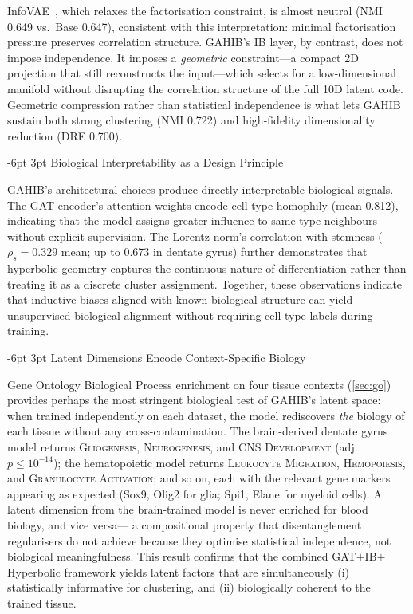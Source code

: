 \documentclass[preprint,12pt]{elsarticle}
\makeatletter
\renewcommand\subsection{\@startsection{subsection}{2}{\z@}%
  {-6pt \@plus -2pt \@minus -2pt}%
  {3pt \@plus 1pt \@minus 1pt}%
  {\normalfont\large\bfseries}}
\makeatother
\begin{document}
InfoVAE~\cite{zhao2019infovae}, which relaxes the factorisation
constraint, is almost neutral (NMI 0.649 vs.\ Base 0.647), consistent
with this interpretation: minimal factorisation pressure preserves
correlation structure.
GAHIB's IB layer, by contrast, does not impose independence. It imposes
a \emph{geometric} constraint---a compact 2D projection that still
reconstructs the input---which selects for a low-dimensional manifold
without disrupting the correlation structure of the full 10D latent
code. Geometric compression rather than statistical independence is
what lets GAHIB sustain both strong clustering (NMI 0.722) and
high-fidelity dimensionality reduction (DRE 0.700).

\subsection{Biological Interpretability as a Design Principle}

GAHIB's architectural choices produce directly interpretable biological
signals.
The GAT encoder's attention weights encode cell-type homophily
(mean 0.812), indicating that the model assigns greater influence to
same-type neighbours without explicit supervision.
The Lorentz norm's correlation with stemness ($\rho_s = 0.329$ mean;
up to 0.673 in dentate gyrus) further demonstrates that hyperbolic
geometry captures the continuous nature of differentiation rather than
treating it as a discrete cluster assignment.
Together, these observations indicate that inductive biases aligned with
known biological structure can yield unsupervised biological alignment
without requiring cell-type labels during training.

\subsection{Latent Dimensions Encode Context-Specific Biology}

Gene Ontology Biological Process enrichment on four tissue contexts
(\cref{sec:go}) provides perhaps the most stringent biological test
of GAHIB's latent space: when trained independently on each dataset,
the model rediscovers \emph{the} biology of each tissue without any
cross-contamination.
The brain-derived dentate gyrus model returns \textsc{Gliogenesis},
\textsc{Neurogenesis}, and \textsc{CNS Development}
(adj.~$p{\leq}10^{-14}$);
the hematopoietic model returns
\textsc{Leukocyte Migration}, \textsc{Hemopoiesis}, and
\textsc{Granulocyte Activation};
and so on, each with the relevant gene markers appearing as expected
(Sox9, Olig2 for glia; Spi1, Elane for myeloid cells).
A latent dimension from the brain-trained model is never enriched for
blood biology, and vice versa---%
a compositional property that disentanglement regularisers do not
achieve because they optimise statistical independence, not biological
meaningfulness.
This result confirms that the combined GAT$+$IB$+$Hyperbolic framework
yields latent factors that are simultaneously (i) statistically informative
for clustering, and (ii) biologically coherent to the trained tissue.
\end{document}
